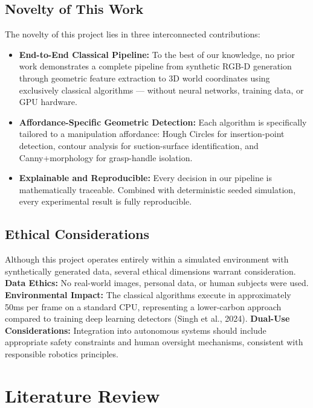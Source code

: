 \documentclass[11pt,a4paper]{article}
\begin{document}
\subsection{Novelty of This Work}

The novelty of this project lies in three interconnected contributions:

\begin{itemize}[leftmargin=1.2cm]
  \item \textbf{End-to-End Classical Pipeline:} To the best of our knowledge, no prior work demonstrates a complete pipeline from synthetic RGB-D generation through geometric feature extraction to 3D world coordinates using exclusively classical algorithms --- without neural networks, training data, or GPU hardware.
  \item \textbf{Affordance-Specific Geometric Detection:} Each algorithm is specifically tailored to a manipulation affordance: Hough Circles for insertion-point detection, contour analysis for suction-surface identification, and Canny+morphology for grasp-handle isolation.
  \item \textbf{Explainable and Reproducible:} Every decision in our pipeline is mathematically traceable. Combined with deterministic seeded simulation, every experimental result is fully reproducible.
\end{itemize}

\subsection{Ethical Considerations}

Although this project operates entirely within a simulated environment with synthetically generated data, several ethical dimensions warrant consideration. \textbf{Data Ethics:} No real-world images, personal data, or human subjects were used. \textbf{Environmental Impact:} The classical algorithms execute in approximately 50ms per frame on a standard CPU, representing a lower-carbon approach compared to training deep learning detectors (Singh et al., 2024). \textbf{Dual-Use Considerations:} Integration into autonomous systems should include appropriate safety constraints and human oversight mechanisms, consistent with responsible robotics principles.

\section{Literature Review}
\end{document}
